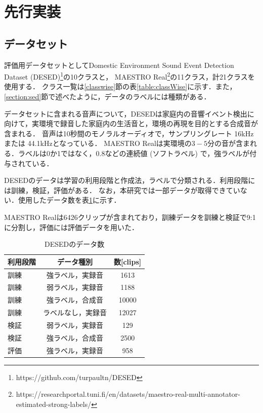 \documentclass[main]{subfiles}
\begin{document}
\section{先行実装}
\subsection{データセット}
評価用データセットとしてDomestic Environment Sound Event Detection Dataset (DESED)\footnote{https://github.com/turpaultn/DESED}\cite{turpault2019sound,serizel2020sound}の10クラスと，
MAESTRO Real\footnote{https://researchportal.tuni.fi/en/datasets/maestro-real-multi-annotator-estimated-strong-labels/}\cite{martin2023strong}の11クラス，計21クラスを使用する．
クラス一覧は\ref{classwise}節の表\ref{table:classWise}に示す．また，\ref{section:sed}節で述べたように，データのラベルには種類がある．\par

データセットに含まれる音声について，DESEDは家庭内の音響イベント検出に向けて，実環境で録音した家庭内の生活音と，環境の再現を目的とする合成音が含まれる．
音声は10秒間のモノラルオーディオで，サンプリングレート 16kHz または 44.1kHzとなっている．
MAESTRO Realは実環境の$3-5$分の音が含まれる．ラベルは0か1ではなく，0.8などの連続値 (ソフトラベル) で，強ラベルが付与されている．\par
DESEDのデータは学習の利用段階と作成法，ラベルで分類される．利用段階には訓練，検証，評価がある．
なお，本研究では一部データが取得できていない．使用したデータ数を表\ref{table:desed}に示す．\par
MAESTRO Realは6426クリップが含まれており，訓練データを訓練と検証で9:1に分割し，評価には評価データを用いた．
\begin{table}[H]
 \begin{center}
   \renewcommand{\arraystretch}{0.85}
   \small
   \begin{tabular}{|l|c|c|}
    \hline
    利用段階 & データ種別  & 数[clips] \\
    \hline
    訓練 & 強ラベル，実録音 & 1613 \\
    訓練 & 弱ラベル，実録音 & 1188 \\
    訓練 & 強ラベル，合成音 & 10000 \\
    訓練 & ラベルなし，実録音 & 12027 \\
    検証 & 弱ラベル，実録音 & 129 \\
    検証 & 強ラベル，合成音 & 2500 \\
    評価 & 強ラベル，実録音  & 958 \\
    \hline
  \end{tabular}
  \caption{DESEDのデータ数}
  \label{table:desed}
\end{center}
\end{table}
\end{document}
